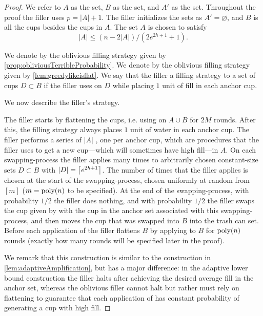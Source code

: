 \begin{proof}
  We refer to $A$ as the  set, $B$ as the
   set, and $A'$ as the  set.
  Throughout the proof the filler uses $p=|A|+1$.
  The filler initializes the sets as $A' = \varnothing$, and $B$
  is all the cups besides the cups in $A$.
  The set $A$ is chosen to satisfy 
  \begin{equation}
    \label{eq:chooseBmuchbiggerthanA}
    |A| \le (n - 2|A|) / (2e^{2h+1} + 1).
  \end{equation}

We denote by \randalg the oblivious filling
strategy given by \cref{prop:obliviousTerribleProbability}. 
We denote by \flatalg the oblivious filling
strategy given by \cref{lem:greedylikeisflat}.
We say that the filler  a filling strategy
\genericalg to a set of cups $D \subset B$ if the filler uses
\genericalg on $D$ while placing $1$ unit of fill in each anchor cup. 

We now describe the filler's strategy.

The filler starts by flattening the cups, i.e. using \flatalg on
$A\cup B$ for $2M$ rounds. After this, the filling strategy
always places $1$ unit of water in each anchor cup. The filler
performs a series of $|A|$ , one per
anchor cup, which are procedures that the filler uses to get a
new cup---which will sometimes have high fill---in $A$. On each
swapping-process the filler applies \randalg many times to
arbitrarily chosen constant-size sets $D \subset B$ with $|D| =
\left\lceil e^{2h+1} \right\rceil$. The number of times that the filler applies
\randalg is chosen at the start of the swapping-process, chosen
uniformly at random from $[m]$ ($m = \operatorname{\text{poly}}(n)$ to be
specified). At the end of the swapping-process, with probability
$1/2$ the filler does nothing, and with probability $1/2$ the filler swaps
the cup given by \randalg with the cup in the anchor set
associated with this swapping-process, and then moves the cup
that was swapped into $B$ into the trash can set. Before each application of
\randalg the filler flattens $B$ by applying \flatalg to $B$ for
$\operatorname{\text{poly}}(n)$ rounds (exactly how many rounds will be specified
later in the proof). 

We remark that this construction is similar to
the construction in \cref{lem:adaptiveAmplification}, but has a
major difference: in the adaptive lower bound construction the
filler halts after achieving the desired average fill in the
anchor set, whereas the oblivious filler cannot halt but rather
must rely on flattening to guarantee that each application of
\randalg has constant probability of generating a cup with high fill.


\end{proof}
